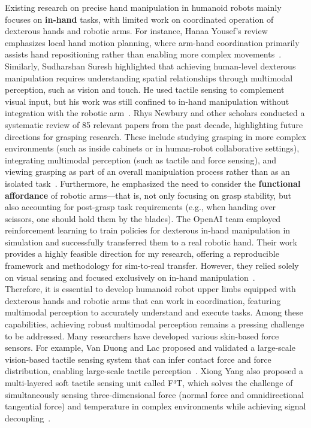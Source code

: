 \documentclass[11pt,a4paper]{article}
\begin{document}
Existing research on precise hand manipulation in humanoid robots mainly focuses on \textbf{in-hand} tasks, with limited work on coordinated operation of dexterous hands and robotic arms. For instance, Hanaa Yousef's review emphasizes local hand motion planning, where arm-hand coordination primarily assists hand repositioning rather than enabling more complex movements~\cite{yousef2011tactile}. Similarly, Sudharshan Suresh highlighted that achieving human-level dexterous manipulation requires understanding spatial relationships through multimodal perception, such as vision and touch. He used tactile sensing to complement visual input, but his work was still confined to in-hand manipulation without integration with the robotic arm~\cite{suresh2024neuralfeels}. Rhys Newbury and other scholars conducted a systematic review of 85 relevant papers from the past decade, highlighting future directions for grasping research. These include studying grasping in more complex environments (such as inside cabinets or in human-robot collaborative settings), integrating multimodal perception (such as tactile and force sensing), and viewing grasping as part of an overall manipulation process rather than as an isolated task~\cite{newbury2023deep}. Furthermore, he emphasized the need to consider the \textbf{functional affordance} of robotic arms—that is, not only focusing on grasp stability, but also accounting for post-grasp task requirements (e.g., when handing over scissors, one should hold them by the blades). The OpenAI team employed reinforcement learning to train policies for dexterous in-hand manipulation in simulation and successfully transferred them to a real robotic hand. Their work provides a highly feasible direction for my research, offering a reproducible framework and methodology for sim-to-real transfer. However, they relied solely on visual sensing and focused exclusively on in-hand manipulation~\cite{andrychowicz2020learning}.\\
Therefore, it is essential to develop humanoid robot upper limbs equipped with dexterous hands and robotic arms that can work in coordination, featuring multimodal perception to accurately understand and execute tasks. Among these capabilities, achieving robust multimodal perception remains a pressing challenge to be addressed. Many researchers have developed various skin-based force sensors. For example, Van Duong and Lac proposed and validated a large-scale vision-based tactile sensing system that can infer contact force and force distribution, enabling large-scale tactile perception~\cite{van2020large}. Xiong Yang also proposed a multi-layered soft tactile sensing unit called F³T, which solves the challenge of simultaneously sensing three-dimensional force (normal force and omnidirectional tangential force) and temperature in complex environments while achieving signal decoupling~\cite{YANG2025}.\\
\end{document}
